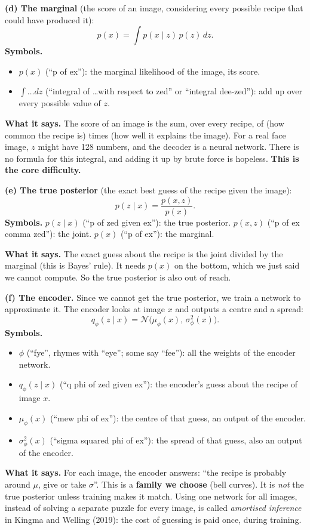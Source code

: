 \textbf{(d) The marginal} (the score of an image, considering every possible recipe that could have produced it):
\[
p(x) = \int p(x \mid z)\, p(z)\, dz.
\]
\textbf{Symbols.}
\begin{itemize}[leftmargin=1.5em, itemsep=0pt]
\item $p(x)$ (``p of ex''): the marginal likelihood of the image, its score.
\item $\int \ldots dz$ (``integral of \ldots with respect to zed'' or ``integral dee-zed''): add up over every possible value of $z$.
\end{itemize}
\textbf{What it says.} The score of an image is the sum, over every recipe, of (how common the recipe is) times (how well it explains the image). For a real face image, $z$ might have 128 numbers, and the decoder is a neural network. There is no formula for this integral, and adding it up by brute force is hopeless. \textbf{This is the core difficulty.}

\textbf{(e) The true posterior} (the exact best guess of the recipe given the image):
\[
p(z \mid x) = \frac{p(x, z)}{p(x)}.
\]
\textbf{Symbols.} $p(z \mid x)$ (``p of zed given ex''): the true posterior. $p(x, z)$ (``p of ex comma zed''): the joint. $p(x)$ (``p of ex''): the marginal.

\textbf{What it says.} The exact guess about the recipe is the joint divided by the marginal (this is Bayes' rule). It needs $p(x)$ on the bottom, which we just said we cannot compute. So the true posterior is also out of reach.

\textbf{(f) The encoder.} Since we cannot get the true posterior, we train a network to approximate it. The encoder looks at image $x$ and outputs a centre and a spread:
\[
q_\phi(z \mid x) = \mathcal{N}\big(\mu_\phi(x),\, \sigma^2_\phi(x)\big).
\]
\textbf{Symbols.}
\begin{itemize}[leftmargin=1.5em, itemsep=0pt]
\item $\phi$ (``fye'', rhymes with ``eye''; some say ``fee''): all the weights of the encoder network.
\item $q_\phi(z \mid x)$ (``q phi of zed given ex''): the encoder's guess about the recipe of image $x$.
\item $\mu_\phi(x)$ (``mew phi of ex''): the centre of that guess, an output of the encoder.
\item $\sigma^2_\phi(x)$ (``sigma squared phi of ex''): the spread of that guess, also an output of the encoder.
\end{itemize}
\textbf{What it says.} For each image, the encoder answers: ``the recipe is probably around $\mu$, give or take $\sigma$''. This is a \textbf{family we choose} (bell curves). It is \emph{not} the true posterior unless training makes it match. Using one network for all images, instead of solving a separate puzzle for every image, is called \emph{amortised inference} in Kingma and Welling (2019): the cost of guessing is paid once, during training.

